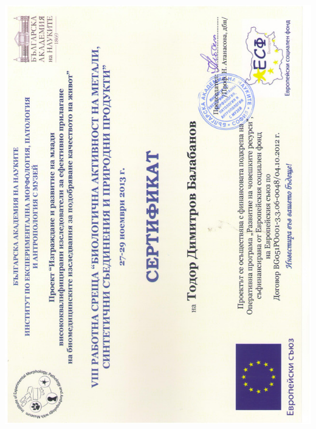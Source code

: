 \documentclass[english,a4paper]{europasscv}
\begin{document}
\includegraphics[width=\textwidth,height=\textheight,keepaspectratio]{IEMPAM2013_5}
\end{document}
